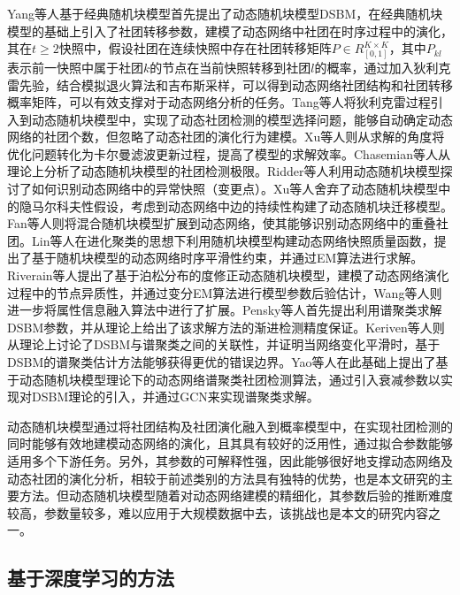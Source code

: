 Yang等人\cite{yang2011detecting}基于经典随机块模型首先提出了动态随机块模型DSBM，在经典随机块模型的基础上引入了社团转移参数，建模了动态网络中社团在时序过程中的演化，其在$t \ge 2$快照中，假设社团在连续快照中存在社团转移矩阵$P \in R^{K \times K}_{[0,1]}$，其中$P_{kl}$表示前一快照中属于社团$k$的节点在当前快照转移到社团$l$的概率，通过加入狄利克雷先验，结合模拟退火算法和吉布斯采样，可以得到动态网络社团结构和社团转移概率矩阵，可以有效支撑对于动态网络分析的任务。Tang等人\cite{tang2014detecting}将狄利克雷过程引入到动态随机块模型中，实现了动态社团检测的模型选择问题，能够自动确定动态网络的社团个数，但忽略了动态社团的演化行为建模。Xu等人\cite{xu2014dynamic}则从求解的角度将优化问题转化为卡尔曼滤波更新过程，提高了模型的求解效率。Chasemian等人\cite{ghasemian2016detectability}从理论上分析了动态随机块模型的社团检测极限。Ridder等人\cite{de2016detection}利用动态随机块模型探讨了如何识别动态网络中的异常快照（变更点）。Xu等人\cite{xu2015stochastic}舍弃了动态随机块模型中的隐马尔科夫性假设，考虑到动态网络中边的持续性构建了动态随机块迁移模型。Fan等人\cite{fan2014dynamic}则将混合随机块模型扩展到动态网络，使其能够识别动态网络中的重叠社团。Lin等人\cite{lin2009analyzing}在进化聚类的思想下利用随机块模型构建动态网络快照质量函数，提出了基于随机块模型的动态网络时序平滑性约束，并通过EM算法进行求解。Riverain等人\cite{riverain2023poisson}提出了基于泊松分布的度修正动态随机块模型，建模了动态网络演化过程中的节点异质性，并通过变分EM算法进行模型参数后验估计，Wang等人\cite{RJXB20241211002}则进一步将属性信息融入算法中进行了扩展。Pensky等人\cite{pensky2019spectral}首先提出利用谱聚类求解DSBM参数，并从理论上给出了该求解方法的渐进检测精度保证。Keriven等人\cite{keriven2022sparse}则从理论上讨论了DSBM与谱聚类之间的关联性，并证明当网络变化平滑时，基于DSBM的谱聚类估计方法能够获得更优的错误边界。Yao等人\cite{yao2021interpretable}在此基础上提出了基于动态随机块模型理论下的动态网络谱聚类社团检测算法，通过引入衰减参数以实现对DSBM理论的引入，并通过GCN来实现谱聚类求解。

动态随机块模型通过将社团结构及社团演化融入到概率模型中，在实现社团检测的同时能够有效地建模动态网络的演化，且其具有较好的泛用性，通过拟合参数能够适用多个下游任务。另外，其参数的可解释性强，因此能够很好地支撑动态网络及动态社团的演化分析，相较于前述类别的方法具有独特的优势，也是本文研究的主要方法。但动态随机块模型随着对动态网络建模的精细化，其参数后验的推断难度较高，参数量较多，难以应用于大规模数据中去，该挑战也是本文的研究内容之一。



\subsection{基于深度学习的方法}

